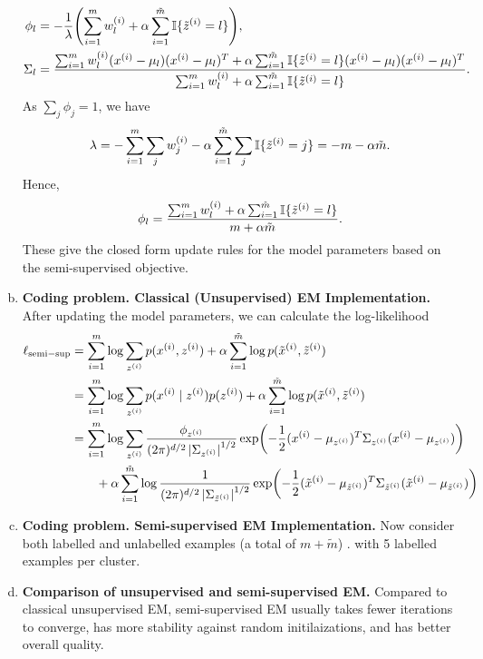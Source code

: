 \documentclass[12pt,letterpaper,boxed]{hmcpset}
\newcommand{\ww}{w^{(i)}}
\newcommand{\ind}[1]{\mathbb{I}\{#1\}}
\newcommand{\lsemi}{\ell_{\mathrm{semi-sup}}}
\newcommand{\summ}{\sum_{i=1}^m}
\newcommand{\sumtm}{\sum_{i=1}^{\tilde m}}
\begin{document}
\begin{solution}
\begin{enumerate}[(a)]
\[\begin{aligned}
      \phi_l &= - \frac{1}{\lambda} \qty(\summ \ww_l + \alpha \sumtm \ind{\tzz = l}), \\
      \Sigma_l &= \frac{\summ \ww_l (\xx - \mu_l)(\xx - \mu_l)^T + \alpha \sumtm \ind{\tzz = l} (\xx - \mu_l)(\xx - \mu_l)^T}{\summ \ww_l + \alpha \sumtm \ind{\tzz = l}}.
    \end{aligned}
    \]
    As $\sum_j \phi_j = 1$, we have
    \[
    \lambda = - \summ \sum_j \ww_j - \alpha \sumtm \sum_j\ind{\tzz = j} = - m - \alpha \tilde{m}.
    \]
    Hence,
    \[
    \phi_l = \frac{\summ \ww_l + \alpha \sumtm \ind{\tzz = l}}{m + \alpha \tilde{m}}.
    \]
    These give the closed form update rules for the model parameters based on the semi-supervised objective.

    \item \textbf{Coding problem. Classical (Unsupervised) EM Implementation.} After updating the model parameters, we can calculate the log-likelihood
    \[
    \begin{aligned}
      \lsemi &= \summ \log \sum_{\zz} p(\xx, \zz) + \alpha \sumtm \log p(\txx, \tzz) \\
      &= \summ \log \sum_{\zz} p(\xx \mid \zz) p(\zz) + \alpha \sumtm \log p(\txx, \tzz) \\
      &= \summ \log \sum_{\zz} \frac{\phi_{\zz}}{(2\pi)^{d/2} \abs{\Sigma_{\zz}}^{1/2}} \exp(-\frac{1}{2}(\xx - \mu_{\zz})^T \Sigma_{\zz} (\xx - \mu_{\zz})) \\
      & \qquad + \alpha \sumtm \log \frac{1}{(2\pi)^{d/2} \abs{\Sigma_{\tzz}}^{1/2}} \exp(-\frac{1}{2}(\txx - \mu_{\tzz})^T \Sigma_{\tzz} (\txx - \mu_{\tzz}))
    \end{aligned}
    \]

    \item \textbf{Coding problem. Semi-supervised EM Implementation.} Now consider both labelled and unlabelled examples (a total of $m + \tilde{m}$) . with 5 labelled examples per cluster.
    
    \item \textbf{Comparison of unsupervised and semi-supervised EM.} Compared to classical unsupervised EM, semi-supervised EM usually takes fewer iterations to converge, has more stability against random initilaizations, and has better overall quality.
  \end{enumerate}
\end{solution}
\end{document}
